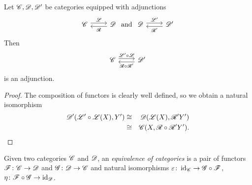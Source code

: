 \documentclass[10pt]{amsart}
\begin{document}
\begin{prop}\label{composeadjunctions}
  Let $\mathscr{C}, \mathscr{D}, \mathscr{D}^\prime$ be categories equipped with adjunctions
  $$\begin{tikzcd}
    \C \arrow[shift left]{r}{\LA} & \D \arrow[shift left]{l}{\RA}
  \end{tikzcd}
  \ \text{and}\ 
  \begin{tikzcd}
    \D \arrow[shift left]{r}{\LA^\prime} & \D^\prime \arrow[shift left]{l}{\RA^\prime}
  \end{tikzcd}$$
  Then 
  $$\begin{tikzcd}
    \C \arrow[shift left]{r}{\LA^\prime \circ \LA} & \D^\prime \arrow[shift left]{l}{\RA \circ \RA^\prime}
  \end{tikzcd}$$
  is an adjunction.

  \begin{proof}
    The composition of functors is clearly well defined, so we obtain a natural isomorphism
    \begin{eqnarray*}
      \mathscr{D}^\prime(\mathscr{L}^\prime \circ \mathscr{L}(X), Y^\prime) &\cong& 
      \mathscr{D}(\mathscr{L}(X), \mathscr{R}^\prime Y^\prime)\\
      &\cong& \mathscr{C}(X, \mathscr{R} \circ \mathscr{R}^\prime Y^\prime).
    \end{eqnarray*}
  \end{proof}
\end{prop}

\begin{defn}
  Given two categories $\mathscr{C}$ and $\mathscr{D}$, an {\it equivalence of categories} is a pair of functors $\mathscr{F} \colon \mathscr{C} \to \mathscr{D}$ and $\mathscr{G} \colon \mathscr{D} \to \mathscr{C}$ and natural isomorphisms $\varepsilon \colon \operatorname{id}_{\mathscr{C}} \to \mathscr{G} \circ \mathscr{F}$, $\eta \colon \mathscr{F} \circ \mathscr{G} \to \operatorname{id}_{\mathscr{D}}$.
\end{defn}
\end{document}
